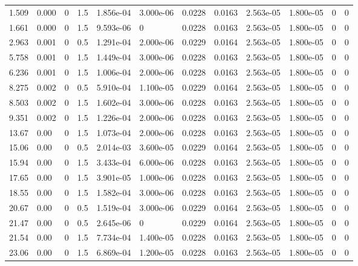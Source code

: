 \documentclass[preview]{standalone}
\begin{document}
{{\begin{tabular}{L{1.2cm}C{1.2cm} C{0.3cm}C{0.5cm} C{1.4cm}C{1.4cm} C{1.4cm}C{1.4cm} C{1.6cm}C{1.6cm} C{1.6cm}C{1.6cm}}
  1.509  &  0.000  & 0     & 1.5 &  1.856e-04  & 3.000e-06  &  0.0228&   0.0163& 2.563e-05 & 1.800e-05   &  0 & 0  \\ 
  1.661  &  0.000  & 0     & 1.5 &  9.593e-06  & 0  &  0.0228&   0.0163& 2.563e-05 & 1.800e-05   &  0 & 0  \\ 
  2.963  &  0.001  & 0     & 0.5 &  1.291e-04  & 2.000e-06  &  0.0229&   0.0164& 2.563e-05 & 1.800e-05   &  0 & 0  \\ 
  5.758  &  0.001  & 0     & 1.5 &  1.449e-04  & 3.000e-06  &  0.0228&   0.0163& 2.563e-05 & 1.800e-05   &  0 & 0  \\ 
  6.236  &  0.001  & 0     & 1.5 &  1.006e-04  & 2.000e-06  &  0.0228&   0.0163& 2.563e-05 & 1.800e-05   &  0 & 0  \\ 
  8.275  &  0.002  & 0     & 0.5 &  5.910e-04  & 1.100e-05  &  0.0229&   0.0164& 2.563e-05 & 1.800e-05   &  0 & 0  \\ 
  8.503  &  0.002  & 0     & 1.5 &  1.602e-04  & 3.000e-06  &  0.0228&   0.0163& 2.563e-05 & 1.800e-05   &  0 & 0  \\ 
  9.351  &  0.002  & 0     & 1.5 &  1.226e-04  & 2.000e-06  &  0.0228&   0.0163& 2.563e-05 & 1.800e-05   &  0 & 0  \\ 
  13.67  &  0.00  & 0     & 1.5 &  1.073e-04  & 2.000e-06  &  0.0228&   0.0163& 2.563e-05 & 1.800e-05   &  0 & 0  \\ 
  15.06  &  0.00  & 0     & 0.5 &  2.014e-03  & 3.600e-05  &  0.0229&   0.0164& 2.563e-05 & 1.800e-05   &  0 & 0  \\ 
  15.94  &  0.00  & 0     & 1.5 &  3.433e-04  & 6.000e-06  &  0.0228&   0.0163& 2.563e-05 & 1.800e-05   &  0 & 0  \\ 
  17.65  &  0.00  & 0     & 1.5 &  3.901e-05  & 1.000e-06  &  0.0228&   0.0163& 2.563e-05 & 1.800e-05   &  0 & 0  \\ 
  18.55  &  0.00  & 0     & 1.5 &  1.582e-04  & 3.000e-06  &  0.0228&   0.0163& 2.563e-05 & 1.800e-05   &  0 & 0  \\ 
  20.67  &  0.00  & 0     & 0.5 &  1.519e-04  & 3.000e-06  &  0.0229&   0.0164& 2.563e-05 & 1.800e-05   &  0 & 0  \\ 
  21.47  &  0.00  & 0     & 0.5 &  2.645e-06  & 0  &  0.0229&   0.0164& 2.563e-05 & 1.800e-05   &  0 & 0  \\ 
  21.54  &  0.00  & 0     & 1.5 &  7.734e-04  & 1.400e-05  &  0.0228&   0.0163& 2.563e-05 & 1.800e-05   &  0 & 0  \\ 
  23.06  &  0.00  & 0     & 1.5 &  6.869e-04  & 1.200e-05  &  0.0228&   0.0163& 2.563e-05 & 1.800e-05   &  0 & 0  \\ 

\end{tabular}}}
\end{document}

